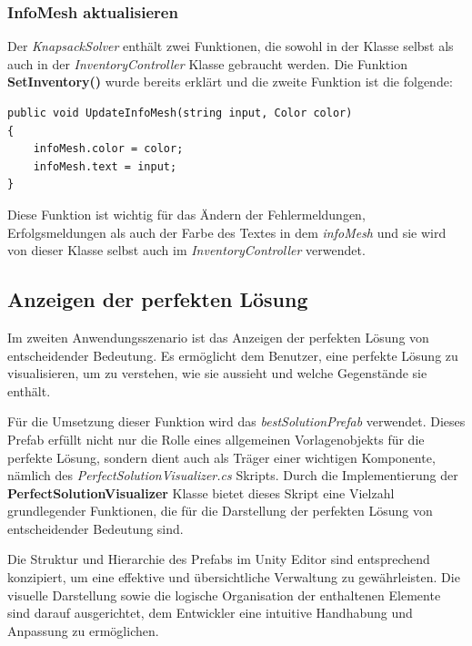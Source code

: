 \subsubsection{InfoMesh aktualisieren}
Der \textit{KnapsackSolver} enthält zwei Funktionen, die sowohl in der Klasse selbst als auch in der
\textit{InventoryController} Klasse gebraucht werden. Die Funktion \textbf{SetInventory()} wurde bereits erklärt und
die zweite Funktion ist die folgende:

\begin{lstlisting}[style=csharp, caption={Funktion um InfoMesh zu verändern}]
public void UpdateInfoMesh(string input, Color color)
{
    infoMesh.color = color;
    infoMesh.text = input;
}
\end{lstlisting}
Diese Funktion ist wichtig für das Ändern der Fehlermeldungen, Erfolgsmeldungen als auch der Farbe des Textes in dem
\textit{infoMesh} und sie wird von dieser Klasse selbst auch im \textit{InventoryController} verwendet.

\subsection{Anzeigen der perfekten Lösung}
Im zweiten Anwendungsszenario ist das Anzeigen der perfekten Lösung von entscheidender Bedeutung. Es ermöglicht dem Benutzer,
eine perfekte Lösung zu visualisieren, um zu verstehen, wie sie aussieht und welche Gegenstände sie enthält.

Für die Umsetzung dieser Funktion wird das \textit{bestSolutionPrefab} verwendet. Dieses Prefab erfüllt nicht nur die
Rolle eines allgemeinen Vorlagenobjekts für die perfekte Lösung, sondern dient auch als Träger einer wichtigen Komponente,
nämlich des \textit{PerfectSolutionVisualizer.cs} Skripts. Durch die Implementierung der \textbf{PerfectSolutionVisualizer}
Klasse bietet dieses Skript eine Vielzahl grundlegender Funktionen, die für die Darstellung der perfekten Lösung von
entscheidender Bedeutung sind.

Die Struktur und Hierarchie des Prefabs im Unity Editor sind entsprechend konzipiert, um eine effektive und übersichtliche
Verwaltung zu gewährleisten. Die visuelle Darstellung sowie die logische Organisation der enthaltenen Elemente sind darauf
ausgerichtet, dem Entwickler eine intuitive Handhabung und Anpassung zu ermöglichen.

